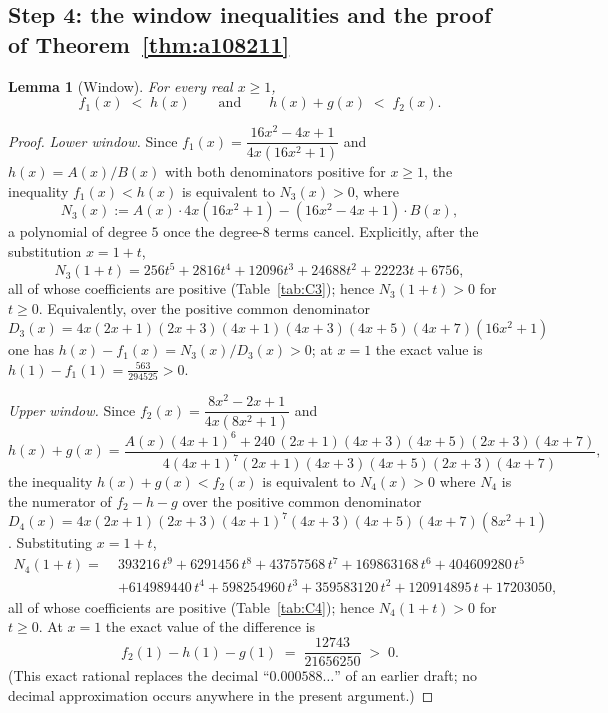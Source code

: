 \documentclass[11pt]{article}
\theoremstyle{plain}
\newtheorem{lemma}[theorem]{Lemma}
\theoremstyle{definition}
\theoremstyle{remark}
\numberwithin{equation}{section}
\begin{document}
\subsection{Step 4: the window inequalities and the proof of Theorem~\ref{thm:a108211}}

\begin{lemma}[Window]
\label{lem:window}
For every real $x \ge 1$,
\[
  f_1(x) \;<\; h(x)
  \qquad\text{and}\qquad
  h(x) + g(x) \;<\; f_2(x).
\]
\end{lemma}

\begin{proof}
\emph{Lower window.} Since $f_1(x) = \dfrac{16x^2-4x+1}{4x(16x^2+1)}$ and $h(x) = A(x)/B(x)$
with both denominators positive for $x \ge 1$, the inequality $f_1(x) < h(x)$ is equivalent to
$N_3(x) > 0$, where
\[
  N_3(x) := A(x)\cdot 4x(16x^2+1) - (16x^2-4x+1)\cdot B(x),
\]
a polynomial of degree $5$ once the degree-$8$ terms cancel. Explicitly, after the substitution
$x = 1+t$,
\[
  N_3(1+t) = 256t^5 + 2816t^4 + 12096t^3 + 24688t^2 + 22223t + 6756,
\]
all of whose coefficients are positive (Table~\ref{tab:C3}); hence $N_3(1+t) > 0$ for $t \ge 0$.
Equivalently, over the positive common denominator
$D_3(x) = 4x(2x+1)(2x+3)(4x+1)(4x+3)(4x+5)(4x+7)(16x^2+1)$ one has
$h(x)-f_1(x) = N_3(x)/D_3(x) > 0$; at $x=1$ the exact value is
$h(1)-f_1(1) = \tfrac{563}{294525} > 0$.

\emph{Upper window.} Since $f_2(x) = \dfrac{8x^2-2x+1}{4x(8x^2+1)}$ and
\[
  h(x) + g(x)
  = \frac{A(x)(4x+1)^6 + 240\,(2x+1)(4x+3)(4x+5)(2x+3)(4x+7)}
         {4(4x+1)^7 (2x+1)(4x+3)(4x+5)(2x+3)(4x+7)},
\]
the inequality $h(x)+g(x) < f_2(x)$ is equivalent to $N_4(x) > 0$ where $N_4$ is the numerator
of $f_2 - h - g$ over the positive common denominator
$D_4(x) = 4x(2x+1)(2x+3)(4x+1)^7(4x+3)(4x+5)(4x+7)(8x^2+1)$. Substituting $x = 1+t$,
\begin{align*}
  N_4(1+t) = \;& 393216\,t^9 + 6291456\,t^8 + 43757568\,t^7 + 169863168\,t^6 + 404609280\,t^5 \\
  &+ 614989440\,t^4 + 598254960\,t^3 + 359583120\,t^2 + 120914895\,t + 17203050,
\end{align*}
all of whose coefficients are positive (Table~\ref{tab:C4}); hence $N_4(1+t) > 0$ for $t \ge 0$.
At $x=1$ the exact value of the difference is
\[
  f_2(1) - h(1) - g(1) \;=\; \frac{12743}{21656250} \;>\; 0 .
\]
(This exact rational replaces the decimal ``$0.000588\ldots$'' of an earlier draft; no decimal
approximation occurs anywhere in the present argument.)
\end{proof}
\end{document}

